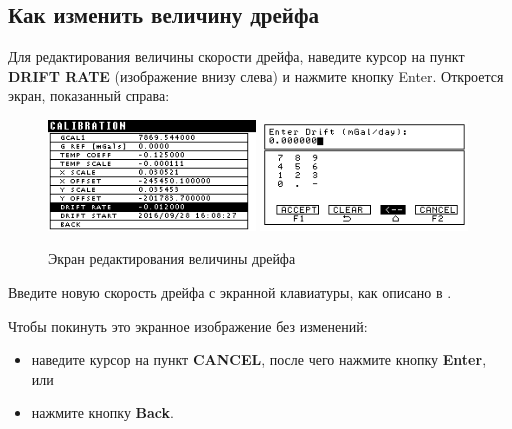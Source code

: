 \subsection{Как изменить величину дрейфа}



Для редактирования величины скорости дрейфа, наведите курсор на пункт
\textbf{DRIFT RATE} (изображение внизу слева) и нажмите кнопку Enter. Откроется
экран, показанный справа:

\newpage
\begin{figure}[H]
  \centering
  \includegraphics[width=0.49\textwidth]{figures/the_drift_rate_editing_screen_1}
  \includegraphics[width=0.49\textwidth]{figures/the_drift_rate_editing_screen_2}
  \caption{Экран редактирования величины дрейфа}
  \label{fig:the_drift_rate_editing_screen}
\end{figure}

Введите новую скорость дрейфа с экранной клавиатуры, как описано в
.

Чтобы покинуть это экранное изображение без изменений:
\begin{itemize}
  \item наведите курсор на пункт \textbf{CANCEL}, после чего нажмите кнопку
    \textbf{Enter}, или

  \item нажмите кнопку \textbf{Back}.
\end{itemize}

